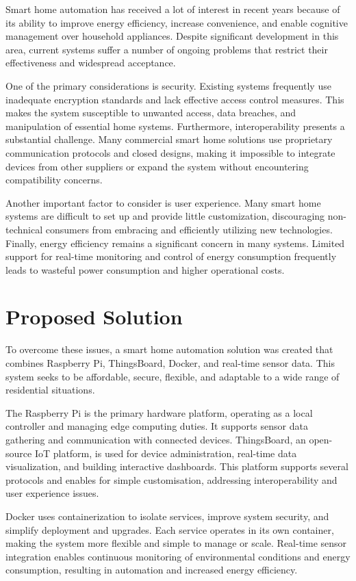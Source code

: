 \documentclass[a4paper,12pt]{report}
\begin{document}
Smart home automation has received a lot of interest in recent years because of its ability to improve energy efficiency, increase convenience, and enable cognitive management over household appliances. Despite significant development in this area, current systems suffer a number of ongoing problems that restrict their effectiveness and widespread acceptance.

One of the primary considerations is security. Existing systems frequently use inadequate encryption standards and lack effective access control measures. This makes the system susceptible to unwanted access, data breaches, and manipulation of essential home systems. Furthermore, interoperability presents a substantial challenge. Many commercial smart home solutions use proprietary communication protocols and closed designs, making it impossible to integrate devices from other suppliers or expand the system without encountering compatibility concerns.

Another important factor to consider is user experience. Many smart home systems are difficult to set up and provide little customization, discouraging non-technical consumers from embracing and efficiently utilizing new technologies. Finally, energy efficiency remains a significant concern in many systems. Limited support for real-time monitoring and control of energy consumption frequently leads to wasteful power consumption and higher operational costs.

\section{Proposed Solution}

To overcome these issues, a smart home automation solution was created that combines Raspberry Pi, ThingsBoard, Docker, and real-time sensor data. This system seeks to be affordable, secure, flexible, and adaptable to a wide range of residential situations.

The Raspberry Pi is the primary hardware platform, operating as a local controller and managing edge computing duties. It supports sensor data gathering and communication with connected devices. ThingsBoard, an open-source IoT platform, is used for device administration, real-time data visualization, and building interactive dashboards. This platform supports several protocols and enables for simple customisation, addressing interoperability and user experience issues.

Docker uses containerization to isolate services, improve system security, and simplify deployment and upgrades. Each service operates in its own container, making the system more flexible and simple to manage or scale. Real-time sensor integration enables continuous monitoring of environmental conditions and energy consumption, resulting in automation and increased energy efficiency.
\end{document}
